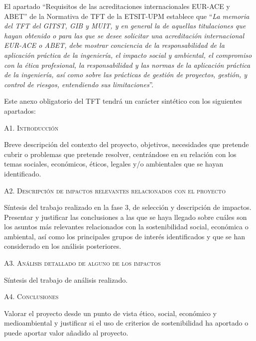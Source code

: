 \normalsize{El apartado ``Requisitos de las acreditaciones internacionales EUR-ACE y ABET'' de la Normativa de TFT de la ETSIT-UPM establece que ``\textit{La memoria del TFT del GITST, GIB y MUIT, y en general la de aquellas titulaciones que hayan obtenido o para las que se desee solicitar una acreditación internacional EUR-ACE o ABET, debe mostrar conciencia de la responsabilidad de la aplicación práctica de la ingeniería, el impacto social y ambiental, el compromiso con la ética profesional, la responsabilidad y las normas de la aplicación práctica de la ingeniería, así como sobre las prácticas de gestión de proyectos, gestión, y control de riesgos, entendiendo sus limitaciones}''.

Este anexo obligatorio del TFT tendrá un carácter sintético con los siguientes apartados:}
\vspace{0.1cm}

\Large{\textsc{\textcolor{nar}{A1. Introducción}}} \par
\normalsize{Breve descripción del contexto del proyecto, objetivos, necesidades que pretende cubrir o problemas que pretende resolver, centrándose en su relación con los temas sociales, económicos, éticos, legales y/o ambientales que se hayan identificado.}
\vspace{0.1cm}

\Large{\textsc{\textcolor{nar}{A2. Descripción de impactos relevantes relacionados con el proyecto}}} \par
\vspace{0.3cm}
\normalsize{Síntesis del trabajo realizado en la fase 3, de selección y descripción de impactos. Presentar y justificar las conclusiones a las que se haya llegado sobre cuáles son los asuntos más relevantes relacionados con la sostenibilidad social, económica o ambiental, así como los principales grupos de interés identificados y que se han considerado en los análisis posteriores. }
\vspace{0.1cm}

\Large{\textsc{\textcolor{nar}{A3. Análisis detallado de alguno de los impactos}}} \par
\vspace{0.3cm}
\normalsize{ Síntesis del trabajo de análisis realizado. }


\Large{\textsc{\textcolor{nar}{A4. Conclusiones}}} \par
\vspace{0.3cm}
\normalsize{Valorar el proyecto desde un punto de vista ético, social, económico y medioambiental y justificar si el uso de criterios de sostenibilidad ha aportado o puede aportar valor añadido al proyecto.}